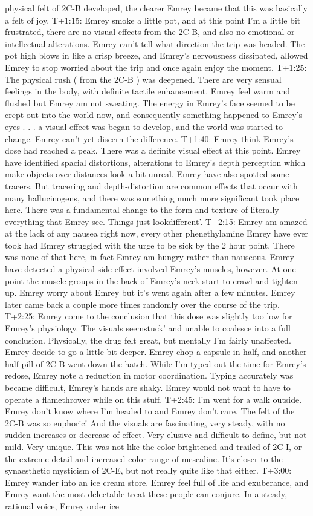 \documentclass[12pt]{book}
\begin{document}
physical felt of 2C-B developed, the clearer Emrey became that this was basically a felt of joy. T+1:15: Emrey smoke a little pot, and at this point I'm a little bit frustrated, there are no visual effects from the 2C-B, and also no emotional or intellectual alterations. Emrey can't tell what direction the trip was headed. The pot high blows in like a crisp breeze, and Emrey's nervousness dissipated, allowed Emrey to stop worried about the trip and once again enjoy the moment. T+1:25: The physical rush ( from the 2C-B ) was deepened. There are very sensual feelings in the body, with definite tactile enhancement. Emrey feel warm and flushed but Emrey am not sweating. The energy in Emrey's face seemed to be crept out into the world now, and consequently something happened to Emrey's eyes . . .  a visual effect was began to develop, and the world was started to change. Emrey can't yet discern the difference. T+1:40: Emrey think Emrey's dose had reached a peak. There was a definite visual effect at this point. Emrey have identified spacial distortions, alterations to Emrey's depth perception which make objects over distances look a bit unreal. Emrey have also spotted some tracers. But tracering and depth-distortion are common effects that occur with many hallucinogens, and there was something much more significant took place here. There was a fundamental change to the form and texture of literally everything that Emrey see. Things just lookdifferent'. T+2:15: Emrey am amazed at the lack of any nausea right now, every other phenethylamine Emrey have ever took had Emrey struggled with the urge to be sick by the 2 hour point. There was none of that here, in fact Emrey am hungry rather than nauseous. Emrey have detected a physical side-effect involved Emrey's muscles, however. At one point the muscle groups in the back of Emrey's neck start to crawl and tighten up. Emrey worry about Emrey but it's went again after a few minutes. Emrey later came back a couple more times randomly over the course of the trip. T+2:25: Emrey come to the conclusion that this dose was slightly too low for Emrey's physiology. The visuals seemstuck' and unable to coalesce into a full conclusion. Physically, the drug felt great, but mentally I'm fairly unaffected. Emrey decide to go a little bit deeper. Emrey chop a capsule in half, and another half-pill of 2C-B went down the hatch. While I'm typed out the time for Emrey's redose, Emrey note a reduction in motor coordination. Typing accurately was became difficult, Emrey's hands are shaky. Emrey would not want to have to operate a flamethrower while on this stuff. T+2:45: I'm went for a walk outside. Emrey don't know where I'm headed to and Emrey don't care. The felt of the 2C-B was so euphoric! And the visuals are fascinating, very steady, with no sudden increases or decrease of effect. Very elusive and difficult to define, but not mild. Very unique. This was not like the color brightened and trailed of 2C-I, or the extreme detail and increased color range of mescaline. It's closer to the synaesthetic mysticism of 2C-E, but not really quite like that either. T+3:00: Emrey wander into an ice cream store. Emrey feel full of life and exuberance, and Emrey want the most delectable treat these people can conjure. In a steady, rational voice, Emrey order ice 
\end{document}
